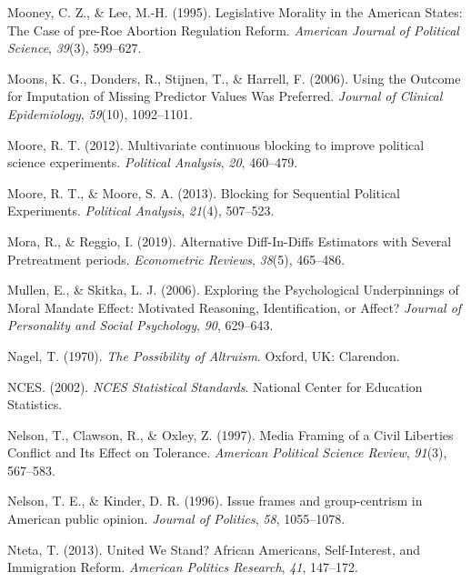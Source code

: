 \documentclass[12pt,econ]{sources/authesis}
\begin{document}
\leavevmode\hypertarget{ref-mooney_1995_legislative}{}%
Mooney, C. Z., \& Lee, M.-H. (1995). Legislative Morality in the American States: The Case of pre-Roe Abortion Regulation Reform. \emph{American Journal of Political Science}, \emph{39}(3), 599--627.

\leavevmode\hypertarget{ref-moons_2006_using}{}%
Moons, K. G., Donders, R., Stijnen, T., \& Harrell, F. (2006). Using the Outcome for Imputation of Missing Predictor Values Was Preferred. \emph{Journal of Clinical Epidemiology}, \emph{59}(10), 1092--1101.

\leavevmode\hypertarget{ref-moore_2012_multivariate}{}%
Moore, R. T. (2012). Multivariate continuous blocking to improve political science experiments. \emph{Political Analysis}, \emph{20}, 460--479.

\leavevmode\hypertarget{ref-moore_blocking_2013}{}%
Moore, R. T., \& Moore, S. A. (2013). Blocking for Sequential Political Experiments. \emph{Political Analysis}, \emph{21}(4), 507--523.

\leavevmode\hypertarget{ref-mora_2019_alternative}{}%
Mora, R., \& Reggio, I. (2019). Alternative Diff-In-Diffs Estimators with Several Pretreatment periods. \emph{Econometric Reviews}, \emph{38}(5), 465--486.

\leavevmode\hypertarget{ref-mullen_2006_exploring}{}%
Mullen, E., \& Skitka, L. J. (2006). Exploring the Psychological Underpinnings of Moral Mandate Effect: Motivated Reasoning, Identification, or Affect? \emph{Journal of Personality and Social Psychology}, \emph{90}, 629--643.

\leavevmode\hypertarget{ref-nagel_1970_possibility}{}%
Nagel, T. (1970). \emph{The Possibility of Altruism}. Oxford, UK: Clarendon.

\leavevmode\hypertarget{ref-education-statistics_2002_nces}{}%
NCES. (2002). \emph{NCES Statistical Standards}. National Center for Education Statistics.

\leavevmode\hypertarget{ref-nelson_media_1997}{}%
Nelson, T., Clawson, R., \& Oxley, Z. (1997). Media Framing of a Civil Liberties Conflict and Its Effect on Tolerance. \emph{American Political Science Review}, \emph{91}(3), 567--583.

\leavevmode\hypertarget{ref-nelson_1996_issue}{}%
Nelson, T. E., \& Kinder, D. R. (1996). Issue frames and group-centrism in American public opinion. \emph{Journal of Politics}, \emph{58}, 1055--1078.

\leavevmode\hypertarget{ref-nteta_2013_united}{}%
Nteta, T. (2013). United We Stand? African Americans, Self-Interest, and Immigration Reform. \emph{American Politics Research}, \emph{41}, 147--172.
\end{document}

